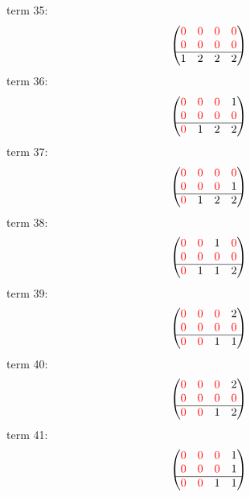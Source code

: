\documentclass{article}
\begin{document}
term 35:
$$\begin{pmatrix}{\color{red} 0} & {\color{red} 0} & {\color{red} 0} & {\color{red} 0}\\
{\color{red} 0} & {\color{red} 0} & {\color{red} 0} & {\color{red} 0}\\
\hline1 & 2 & 2 & 2\\
\end{pmatrix}$$
term 36:
$$\begin{pmatrix}{\color{red} 0} & {\color{red} 0} & {\color{red} 0} & 1\\
{\color{red} 0} & {\color{red} 0} & {\color{red} 0} & {\color{red} 0}\\
\hline{\color{red} 0} & 1 & 2 & 2\\
\end{pmatrix}$$
term 37:
$$\begin{pmatrix}{\color{red} 0} & {\color{red} 0} & {\color{red} 0} & {\color{red} 0}\\
{\color{red} 0} & {\color{red} 0} & {\color{red} 0} & 1\\
\hline{\color{red} 0} & 1 & 2 & 2\\
\end{pmatrix}$$
term 38:
$$\begin{pmatrix}{\color{red} 0} & {\color{red} 0} & 1 & {\color{red} 0}\\
{\color{red} 0} & {\color{red} 0} & {\color{red} 0} & {\color{red} 0}\\
\hline{\color{red} 0} & 1 & 1 & 2\\
\end{pmatrix}$$
term 39:
$$\begin{pmatrix}{\color{red} 0} & {\color{red} 0} & {\color{red} 0} & 2\\
{\color{red} 0} & {\color{red} 0} & {\color{red} 0} & {\color{red} 0}\\
\hline{\color{red} 0} & {\color{red} 0} & 1 & 1\\
\end{pmatrix}$$
term 40:
$$\begin{pmatrix}{\color{red} 0} & {\color{red} 0} & {\color{red} 0} & 2\\
{\color{red} 0} & {\color{red} 0} & {\color{red} 0} & {\color{red} 0}\\
\hline{\color{red} 0} & {\color{red} 0} & 1 & 2\\
\end{pmatrix}$$
term 41:
$$\begin{pmatrix}{\color{red} 0} & {\color{red} 0} & {\color{red} 0} & 1\\
{\color{red} 0} & {\color{red} 0} & {\color{red} 0} & 1\\
\hline{\color{red} 0} & {\color{red} 0} & 1 & 1\\
\end{pmatrix}$$
\end{document}
